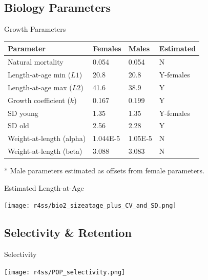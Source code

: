 \documentclass[pdf]{beamer}\usepackage[]{graphicx}\usepackage[]{color}
\begin{document}
\subsection{Biology Parameters}
\begin{frame}{Growth Parameters}
  \begin{table}[ht]
  \small
  \centering
  \begin{tabular}{p{1.5in}p{0.65in}p{0.5in}p{0.75in}}
  Parameter & Females & Males & Estimated  \\ 
  \hline
  Natural mortality  & 0.054 & 0.054 & N \\
  Length-at-age min ($L1$) & 20.8  & 20.8 & Y-females \\
  Length-at-age max ($L2$) & 41.6  & 38.9 & Y \\
  Growth coefficient ($k$) & 0.167 & 0.199 & Y \\
  SD young & 1.35 & 1.35 & Y-females \\
  SD old   & 2.56 & 2.28 & Y \\
  Weight-at-length (alpha) & 1.044E-5 & 1.05E-5 & N \\
  Weight-at-length (beta)  & 3.088 & 3.083 & N \\
  \hline
  \end{tabular}
  \end{table}
  * Male parameters estimated as offsets from female parameters.
\end{frame}

\begin{frame}{Estimated Length-at-Age}
  \begin{center}
    \texttt{[image: r4ss/bio2\_sizeatage\_plus\_CV\_and\_SD.png]}
  \end{center}
\end{frame}

\subsection{Selectivity \& Retention}
\begin{frame}{Selectivity}
  \begin{center}
    \texttt{[image: r4ss/POP\_selectivity.png]}
  \end{center}
\end{frame}
\end{document}
